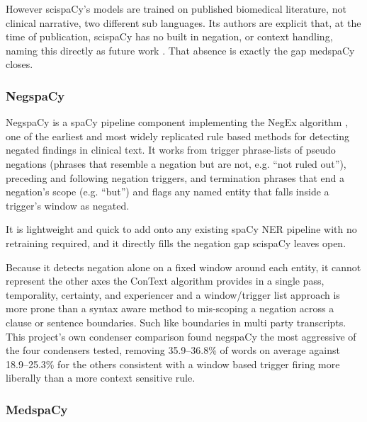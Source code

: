 \documentclass[11pt,a4paper]{article}
\begin{document}
However scispaCy's models are trained on published biomedical literature, not clinical narrative, two different sub languages. Its authors are explicit that, at the time of publication, scispaCy has no built in negation, or context handling, naming this directly as future work \cite{neumann2019scispacy} . That absence is exactly the gap medspaCy closes.

\subsubsection{NegspaCy}
\label{sec:NegspaCy}

NegspaCy \cite{pizarro_negspacy} is a spaCy pipeline component implementing the NegEx algorithm \cite{chapman2001simple} , one of the earliest and most widely replicated rule based methods for detecting negated findings in clinical text. It works from trigger phrase-lists of pseudo negations (phrases that resemble a negation but are not, e.g. “not ruled out”), preceding and following negation triggers, and termination phrases that end a negation's scope (e.g. “but”)  and flags any named entity that falls inside a trigger's window as negated. 

It is lightweight and quick to add onto any existing spaCy NER pipeline with no retraining required, and it directly fills the negation gap scispaCy leaves open. 

Because it detects negation alone on a fixed window around each entity, it cannot represent the other axes the ConText algorithm provides in a single pass, temporality, certainty, and experiencer \cite{harkema2009context} and a window/trigger list approach is more prone than a syntax aware method to mis-scoping a negation across a clause or sentence boundaries. Such like boundaries in multi party transcripts. This project's own condenser comparison  found negspaCy the most aggressive of the four condensers tested, removing 35.9–36.8\% of words on average against 18.9–25.3\% for the others  consistent with a window based trigger firing more liberally than a more context sensitive rule.

\subsubsection{MedspaCy}
\label{sec:MedspaCy}
\end{document}
